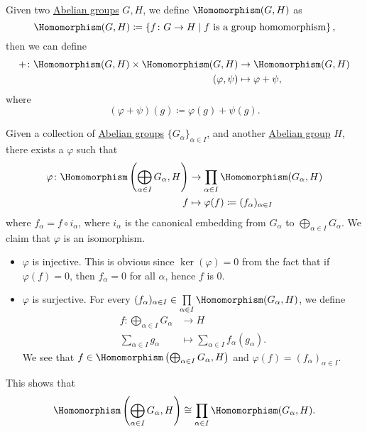 \begin{definition}
	Given two \hyperref[def:Abelian-group]{Abelian groups} \(G, H\), we define \(\Homomorphism (G, H)\) as
	\[
		\Homomorphism (G, H) \coloneqq \left\{f\colon G\to H \mid \text{\(f\) is a group homomorphism} \right\},
	\]
	then we can define
	\[
		\begin{split}
			+\colon \Homomorphism (G, H)\times \Homomorphism (G, H) &\to \Homomorphism (G, H)\\
			(\varphi , \psi )&\mapsto \varphi + \psi,
		\end{split}
	\]
	where
	\[
		(\varphi + \psi )(g)\coloneqq \varphi (g) + \psi (g).
	\]
\end{definition}

\begin{remark}\label{rmk:relation-between-direct-sum-and-direct-product}
	Given a collection of \hyperref[def:Abelian-group]{Abelian groups} \(\{G_\alpha \}_{\alpha \in I}\), and another \hyperref[def:Abelian-group]{Abelian group} \(H\), there exists a
	\(\varphi \) such that
	\[
		\begin{split}
			\varphi \colon \Homomorphism \left(\bigoplus_{\alpha \in I}G_\alpha , H\right)&\to \prod\limits_{\alpha \in I}\Homomorphism (G_\alpha , H)\\
			f&\mapsto \varphi (f)\coloneqq (f_\alpha )_{\alpha \in I}
		\end{split}
	\]
	where \(f_\alpha = f\circ i_\alpha \), where \(i_\alpha \) is the canonical embedding from \(G_\alpha \) to \(\bigoplus_{\alpha \in I}G _\alpha \). We claim
	that \(\varphi \) is an isomorphism.

	\begin{itemize}
		\item \(\varphi \) is injective. This is obvious since \(\ker  (\varphi ) = 0\) from the fact that if \(\varphi (f) = 0\), then \(f_\alpha  = 0\) for all \(\alpha\), hence
		      \(f\) is \(0\).
		\item \(\varphi \) is surjective. For every \((f_\alpha )_{\alpha \in I}\in \prod\limits_{\alpha \in I}\Homomorphism (G_\alpha , H) \), we define
		      \[
			      \begin{split}
				      f\colon \bigoplus_{\alpha \in I}G_\alpha &\to H\\
				      \sum\limits_{\alpha \in I}^{}g_\alpha &\mapsto \sum\limits_{\alpha \in I}f_\alpha (g_\alpha ).
			      \end{split}
		      \]
		      We see that \(f\in \Homomorphism \left(\bigoplus_{\alpha \in I}G_\alpha , H\right)\) and \(\varphi (f) = (f_\alpha )_{\alpha \in I}\).
	\end{itemize}

	This shows that
	\[
		\Homomorphism \left(\bigoplus_{\alpha \in I}G_\alpha , H\right)\cong \prod\limits_{\alpha \in I}\Homomorphism (G_\alpha , H).
	\]
\end{remark}

